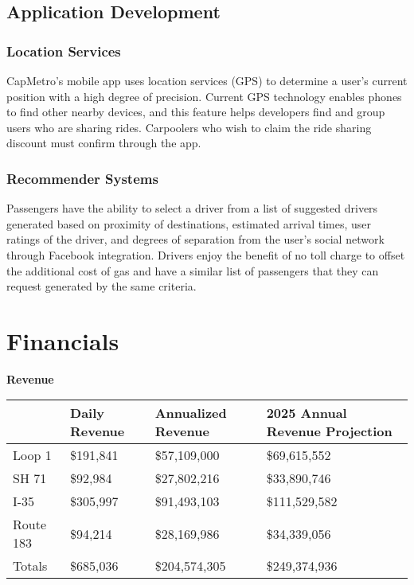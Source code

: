 \documentclass[7pt]{article}
\begin{document}
\subsection{Application Development}
\subsubsection{Location Services}
CapMetro's mobile app uses location services (GPS) to determine a user's current position with a high degree of precision. Current GPS technology enables phones to find other nearby devices, and this feature helps developers find and group users who are sharing rides. Carpoolers who wish to claim the ride sharing discount must confirm through the app. 
\subsubsection{Recommender Systems}
Passengers have the ability to select a driver from a list of suggested drivers generated based on proximity of destinations, estimated arrival times, user ratings of the driver, and degrees of separation from the user's social network through Facebook integration. Drivers enjoy the benefit of no toll charge to offset the additional cost of gas and have a similar list of passengers that they can request generated by the same criteria.
\section{Financials}

\center \textbf{Revenue} \\
\begin{center}
	\begin{tabular}{ | l | l | l | l |}	\hline
    & Daily Revenue & Annualized Revenue & 2025 Annual Revenue Projection \\ \hline
    Loop 1 & \$191,841 & \$57,109,000 & \$69,615,552 \\ \hline
    SH 71 & \$92,984 & \$27,802,216 & \$33,890,746 \\ \hline
    I-35 & \$305,997 & \$91,493,103 & \$111,529,582 \\ \hline
    Route 183 & \$94,214 & \$28,169,986 & \$34,339,056 \\ \hline 
    Totals & \$685,036  & \$204,574,305 & \$249,374,936 \\ \hline
	\end{tabular}
\end{center}
\end{document}
